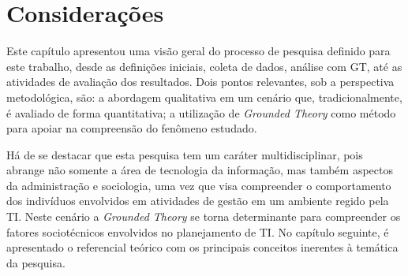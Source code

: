 \section{Considerações}
Este capítulo apresentou uma visão geral do processo de pesquisa definido para este trabalho, desde as definições iniciais, coleta de dados, análise com GT, até as atividades de avaliação dos resultados. Dois pontos relevantes, sob a perspectiva metodológica, são: a abordagem qualitativa em um cenário que, tradicionalmente, é avaliado de forma quantitativa; a utilização de 
\textit{Grounded Theory} como método para apoiar na compreensão do fenômeno estudado. 

Há de se destacar que esta pesquisa tem um caráter multidisciplinar, pois abrange não somente a área de tecnologia da informação, mas também aspectos da administração e sociologia, uma vez que visa compreender o comportamento dos indivíduos envolvidos em atividades de gestão em um ambiente regido pela TI. Neste cenário a \textit{Grounded Theory} se torna determinante para compreender os fatores sociotécnicos envolvidos no planejamento de TI. No capítulo seguinte, é apresentado o referencial teórico com os principais conceitos inerentes à temática da pesquisa.